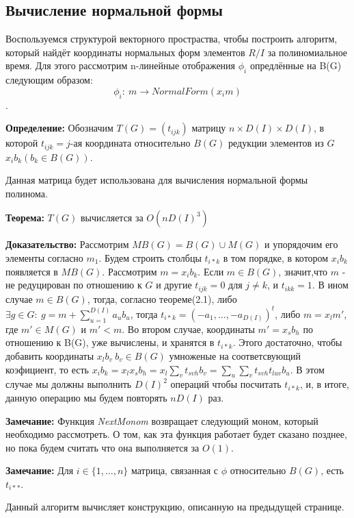 \documentclass{article}
\begin{document}
    \subsection{Вычисление нормальной формы}
    Воспользуемся структурой векторного простраства, чтобы построить алгоритм, который найдёт координаты нормальных форм 
    элементов $R/I$ за полиномиальное время. Для этого рассмотрим n-линейные отображения $\phi_i$  опредлённые на B(G) следующим образом:
    $$\phi_i:\:m\rightarrow NormalForm(x_im)$$.

    \textbf{Определение:}  Обозначим $T(G) = (t_{ijk})$ матрицу $n \times D(I) \times D(I)$, в которой
            $t_{ijk}=j$-ая координата относительно $B(G)$ редукции элементов из $G$ $x_ib_k (b_k \in B(G))$.
 
    Данная матрица будет использована для вычисления нормальной формы полинома.
    
    \textbf{Теорема:} $T(G)$ вычисляется за $O(nD(I)^3)$

    \textbf{Доказательство:} Рассмотрим $MB(G) = B(G) \cup M(G)$ и упорядочим его элементы согласно $m_1$. Будем строить столбцы
    $t_{i*k}$ в том порядке, в котором $x_ib_k$ появляется в $MB(G)$. Рассмотрим $m=x_ib_k$. Если $m \in B(G)$, значит,что $m$ - не 
    редуцирован по отношению к $G$ и другие $t_{ijk} = 0$ для $j \neq k$, и $t_{ikk}=1$. В ином случае $m \in B(G)$, тогда, согласно теореме(2.1), 
    либо $\exists g \in G:\: g=m+\sum_{u=1}^{D(I)} a_ub_u$, тогда $t_{i*k}=(-a_1,\ldots, -a_{D(I)})^t$, либо
    $m=x_lm'$, где $m'\in M(G)$ и $m' < m$. Во втором случае, координаты $m'=x_sb_h$ по отношению к B(G), уже вычислены, и хранятся в $t_{i*k}$. 
    Этого достаточно, чтобы добавить координаты $x_lb_v \: b_v \in B(G)$ умноженые на соответсвующий коэфициент, то есть
    $x_ib_k = x_lx_sb_h = x_l\sum_{v} {t_{svh}b_v}=\sum_u\sum_v{t_{svh}t_{luv}b_u}$. В этом случае мы должны выполнить $D(I)^2$ операций
    чтобы посчитать $t_{i*k}$, и, в итоге, данную операцию мы будем повторять $nD(I)$ раз.

    \textbf{Замечание:} Функция \textit{NextMonom} возвращает следующий моном, который необходимо рассмотреть. О том, как эта функция
    работает будет сказано позднее, но пока будем считать что она выполняется за $O(1)$. 

    \textbf{Замечание:} Для $i \in \{1,\ldots, n\}$ матрица, связанная с $\phi$ относительно $B(G)$, есть $t_{i**}$.
 
    \newpage 
    Данный алгоритм вычисляет конструкцию, описанную на предыдущей странице.
\end{document}
